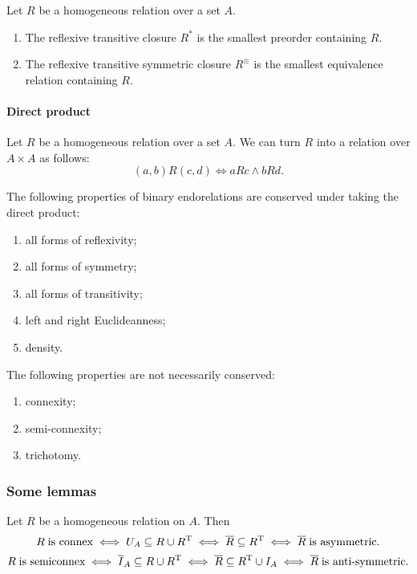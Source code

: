 \begin{lemma}
Let $R$ be a homogeneous relation over a set $A$.
\begin{enumerate}
\item The reflexive transitive closure $R^*$ is the smallest preorder containing $R$.
\item The reflexive transitive symmetric closure $R^\equiv$ is the smallest equivalence relation containing $R$.
\end{enumerate}
\end{lemma}

\paragraph{Direct product}
\begin{definition}
Let $R$ be a homogeneous relation over a set $A$. We can turn $R$ into a relation over $A\times A$ as follows:
\[ (a,b)R(c,d) \iff aRc \land bRd. \]
\end{definition}
\begin{lemma} \label{lemma:relationPropertiesDirectProduct}
The following properties of binary endorelations are conserved under taking the direct product:
\begin{enumerate}
\item all forms of reflexivity;
\item all forms of symmetry;
\item all forms of transitivity;
\item left and right Euclideanness;
\item density.
\end{enumerate}
The following properties are not necessarily conserved:
\begin{enumerate}
\item connexity;
\item semi-connexity;
\item trichotomy.
\end{enumerate}
\end{lemma}

\subsubsection{Some lemmas}
\begin{lemma}
Let $R$ be a homogeneous relation on $A$. Then
\[ R \;\text{is connex} \iff U_A \subseteq R\cup R^{\mathrm{T}} \iff \overline{R}\subseteq R^{\mathrm{T}} \iff \overline{R}\; \text{is asymmetric}. \]
\[ R\; \text{is semiconnex} \iff \overline{I}_A \subseteq R\cup R^{\mathrm{T}} \iff \overline{R}\subseteq R^{\mathrm{T}}\cup I_A \iff \overline{R}\; \text{is anti-symmetric}. \]
\end{lemma}


